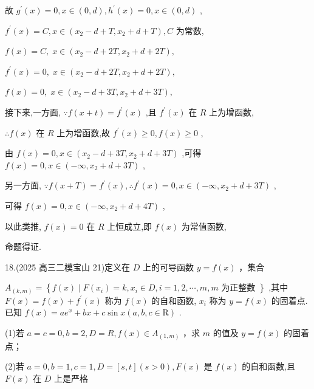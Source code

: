 \documentclass[10pt]{article}
\begin{document}
故 \({g}^{\prime }\left( x\right)  = 0,x \in  \left( {0,d}\right) ,{h}^{\prime }\left( x\right)  = 0,x \in  \left( {0,d}\right)\) ,

\({f}^{\prime }\left( x\right)  = C,x \in  \left( {{x}_{2} - d + T,{x}_{2} + d + T}\right) ,C\) 为常数,

\(f\left( x\right)  = C,\;x \in  \left( {{x}_{2} - d + {2T},{x}_{2} + d + {2T}}\right) ,\)

\({f}^{\prime }\left( x\right)  = 0,\;x \in  \left( {{x}_{2} - d + {2T},{x}_{2} + d + {2T}}\right) ,\)

\(f\left( x\right)  = 0,\;x \in  \left( {{x}_{2} - d + {3T},{x}_{2} + d + {3T}}\right) ,\)

接下来,一方面, \(\because f\left( {x + t}\right)  = {f}^{\prime }\left( x\right)\) ,且 \({f}^{\prime }\left( x\right)\) 在 \(R\) 上为增函数,

\(\therefore f\left( x\right)\) 在 \(R\) 上为增函数,故 \({f}^{\prime }\left( x\right)  \geq  0,f\left( x\right)  \geq  0\) ,

由 \(f\left( x\right)  = 0,x \in  \left( {{x}_{2} - d + {3T},{x}_{2} + d + {3T}}\right)\) ,可得 \(f\left( x\right)  = 0,x \in  \left( {-\infty ,{x}_{2} + d + {3T}}\right)\) ,

另一方面, \(\because f\left( {x + T}\right)  = {f}^{\prime }\left( x\right) ,\therefore {f}^{\prime }\left( x\right)  = 0,x \in  \left( {-\infty ,{x}_{2} + d + {3T}}\right)\) ,

可得 \(f\left( x\right)  = 0,x \in  \left( {-\infty ,{x}_{2} + d + {4T}}\right)\) ,

以此类推, \(f\left( x\right)  = 0\) 在 \(R\) 上恒成立,即 \(f\left( x\right)\) 为常值函数,

命题得证.

18.(2025 高三二模宝山 21)定义在 \(D\) 上的可导函数 \(y = f\left( x\right)\) ，集合

\({A}_{\left( k,m\right) } = \left\{  {f\left( x\right)  \mid  F\left( {x}_{i}\right)  = k,{x}_{i} \in  D,i = 1,2,\cdots ,m,m\text{ 为正整数 }}\right\}\) ,其中 \(F\left( x\right)  = f\left( x\right)  + {f}^{\prime }\left( x\right)\) 称为 \(f\left( x\right)\) 的自和函数, \({x}_{i}\) 称为 \(y = f\left( x\right)\) 的固着点. 已知 \(f\left( x\right)  = a{e}^{x} + {bx} + c\sin x\left( {a,b,c \in  \mathrm{R}}\right)\) .

(1)若 \(a = c = 0,b = 2,D = R,f\left( x\right)  \in  {A}_{\left( 1,m\right) }\) ，求 \(m\) 的值及 \(y = f\left( x\right)\) 的固着点；

(2)若 \(a = 0,b = 1,c = 1,D = \left\lbrack  {s,t}\right\rbrack  \left( {s > 0}\right) ,F\left( x\right)\) 是 \(f\left( x\right)\) 的自和函数,且 \(F\left( x\right)\) 在 \(D\) 上是严格
\end{document}
